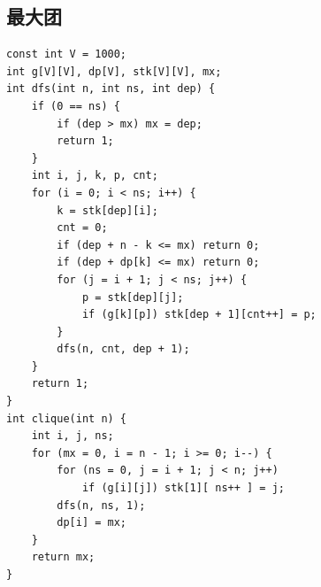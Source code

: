 \documentclass[a4paper]{article}
\begin{document}
\begin{CJK*}{UTF8}{gbsn}
\begin{multicols}{3}
\begin{flushleft}
\begin{lstlisting}
\end{lstlisting}

\subsection{最大团}
\begin{lstlisting}
const int V = 1000;
int g[V][V], dp[V], stk[V][V], mx;
int dfs(int n, int ns, int dep) {
    if (0 == ns) {
        if (dep > mx) mx = dep;
        return 1;
    }
    int i, j, k, p, cnt;
    for (i = 0; i < ns; i++) {
        k = stk[dep][i];
        cnt = 0;
        if (dep + n - k <= mx) return 0;
        if (dep + dp[k] <= mx) return 0;
        for (j = i + 1; j < ns; j++) {
            p = stk[dep][j];
            if (g[k][p]) stk[dep + 1][cnt++] = p;
        }
        dfs(n, cnt, dep + 1);
    }
    return 1;
}
int clique(int n) {
    int i, j, ns;
    for (mx = 0, i = n - 1; i >= 0; i--) {
        for (ns = 0, j = i + 1; j < n; j++)
            if (g[i][j]) stk[1][ ns++ ] = j;
        dfs(n, ns, 1);
        dp[i] = mx;
    }
    return mx;
}
 
\end{lstlisting}


\end{flushleft}
\end{multicols}
\end{CJK*}
\end{document}
